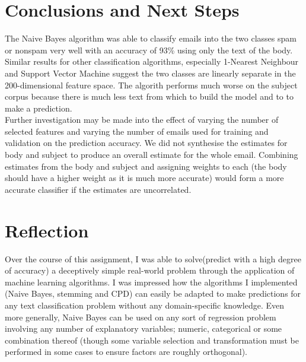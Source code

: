 \documentclass[12pt]{article}
\begin{document}
\section{Conclusions and Next Steps}
The Naive Bayes algorithm was able to classify emails into the two classes spam or nonspam very well with an accuracy of 93\% using only the text of the body. Similar results for other classification algorithms, especially 1-Nearest Neighbour and Support Vector Machine suggest the two classes are linearly separate in the 200-dimensional feature space. The algorith performs much worse on the subject corpus because there is much less text from which to build the model and to to make a prediction.\\
Further investigation may be made into the effect of varying the number of selected features and varying the number of emails used for training and validation on the prediction accuracy. We did not synthesise the estimates for body and subject to produce an overall estimate for the whole email. Combining estimates from the body and subject and assigning weights to each (the body should have a higher weight as it is much more accurate) would form a more accurate classifier if the estimates are uncorrelated.

\section{Reflection}
Over the course of this assignment, I was able to solve(predict with a high degree of accuracy) a deceptively simple real-world problem through the application of machine learning algorithms. I was impressed how the algorithms I implemented (Naive Bayes, stemming and CPD) can easily be adapted to make predictions for any text classification problem without any domain-specific knowledge. Even more generally, Naive Bayes can be used on any sort of regression problem involving any number of explanatory variables; numeric, categorical or some combination thereof (though some variable selection and transformation must be performed in some cases to ensure factors are roughly orthogonal).
\end{document}
